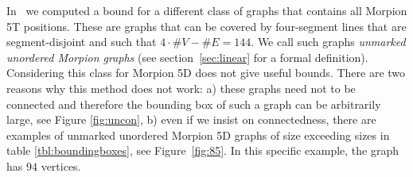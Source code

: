 \begin{remark}
In~\cite{ijcai} we computed a bound for a different class of graphs that contains all Morpion 5T positions.
These are graphs that can be covered by four-segment lines that are segment-disjoint and such that $4\cdot \# V - \# E = 144$.
We call such graphs \emph{unmarked unordered Morpion graphs} (see section~\ref{sec:linear} for a formal definition).
Considering this class for Morpion 5D  does not give useful bounds. There are two reasons why this method does not work:
a) these graphs need not to be connected and therefore the bounding box of such a graph
  can be arbitrarily large, see Figure \ref{fig:uncon}, b) even if we insist on connectedness, there are examples of unmarked unordered Morpion 5D graphs of size exceeding sizes in 
table \ref{tbl:boundingboxes}, see Figure~\ref{fig:85}. In this specific example, the graph has $94$ vertices.
\end{remark}
